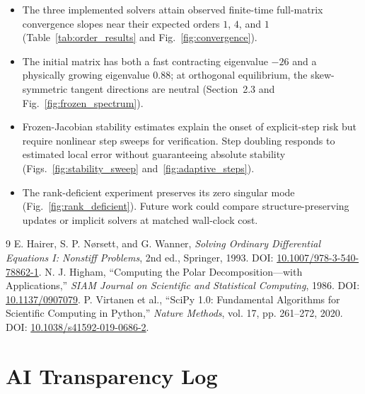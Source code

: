 \documentclass[11pt,a4paper]{article}
\theoremstyle{definition}
\theoremstyle{remark}
\begin{document}
\begin{itemize}[leftmargin=2em]
\item The three implemented solvers attain observed finite-time
  full-matrix convergence slopes near their expected orders
  $1$, $4$, and $1$ (Table~\ref{tab:order_results} and
  Fig.~\ref{fig:convergence}).
\item The initial matrix has both a fast contracting eigenvalue $-26$
  and a physically growing eigenvalue $0.88$; at orthogonal
  equilibrium, the skew-symmetric tangent directions are neutral
  (Section~2.3 and Fig.~\ref{fig:frozen_spectrum}).
\item Frozen-Jacobian stability estimates explain the onset of
  explicit-step risk but require nonlinear step sweeps for
  verification. Step doubling responds to estimated local error
  without guaranteeing absolute stability
  (Figs.~\ref{fig:stability_sweep} and~\ref{fig:adaptive_steps}).
\item The rank-deficient experiment preserves its zero singular
  mode (Fig.~\ref{fig:rank_deficient}). Future work could compare structure-preserving updates or
  implicit solvers at matched wall-clock cost.
\end{itemize}

\newpage
\begin{thebibliography}{9}
E. Hairer, S. P. N\o rsett, and G. Wanner,
\emph{Solving Ordinary Differential Equations I: Nonstiff Problems},
2nd ed., Springer, 1993. DOI: \href{https://doi.org/10.1007/978-3-540-78862-1}{10.1007/978-3-540-78862-1}.
N. J. Higham, ``Computing the Polar Decomposition---with Applications,''
\emph{SIAM Journal on Scientific and Statistical Computing}, 1986.
DOI: \href{https://doi.org/10.1137/0907079}{10.1137/0907079}.
P. Virtanen et al., ``SciPy 1.0: Fundamental Algorithms for Scientific Computing in Python,''
\emph{Nature Methods}, vol. 17, pp. 261--272, 2020.
DOI: \href{https://doi.org/10.1038/s41592-019-0686-2}{10.1038/s41592-019-0686-2}.
\end{thebibliography}

\newpage
\appendix
\section{AI Transparency Log}
\end{document}
